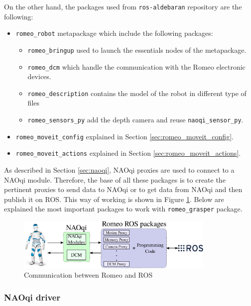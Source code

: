 \documentclass[12pt,a4paper,final,twoside,openright]{report}
\begin{document}
On the other hand, the packages used from \texttt{ros-aldebaran} repository \cite{ros-aldebaran} are the following:

\begin{itemize}
\item \texttt{romeo\_robot} metapackage which include the following packages:
\begin{itemize}
\item \texttt{romeo\_bringup} used to launch the essentials nodes of the metapackage.
\item \texttt{romeo\_dcm} which handle the communication with the Romeo electronic devices.
\item \texttt{romeo\_description} contains the model of the robot in different type of files
\item \texttt{romeo\_sensors\_py} add the depth camera and reuse \texttt{naoqi\_sensor\_py}.
\end{itemize}
\item \texttt{romeo\_moveit\_config} explained in Section \ref{sec:romeo_moveit_config}.
\item \texttt{romeo\_moveit\_actions} explained in Section \ref{sec:romeo_moveit_actions}.
\end{itemize}

As described in Section \ref{sec:naoqi}, NAOqi proxies are used to connect to a NAOqi module. Therefore, the base of all these packages is to create the pertinent proxies to send data to NAOqi or to get data from NAOqi and then publish it on ROS. This way of working is shown in Figure \ref{fig:Romeo-ROS}. Below are explained the most important packages to work with \texttt{romeo\_grasper} package.

\begin{figure}[h]
\centering
\includegraphics[width=0.85\textwidth]{images/Romeo-ROS.eps}
\caption{Communication between Romeo and ROS\label{fig:Romeo-ROS}}
\end{figure}

\subsubsection{NAOqi driver}
\end{document}
